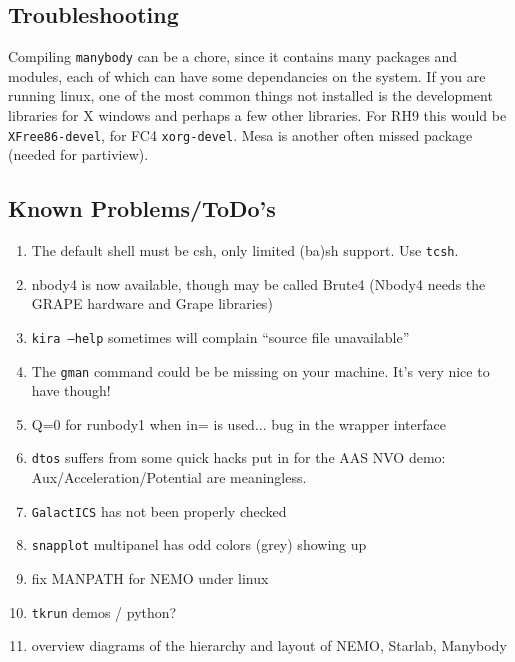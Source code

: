 \begin{itemize}
\begin{itemize}
\chapter                {Troubleshooting}

Compiling {\tt manybody} can be a chore, since it contains many packages
and modules, each of which can have some dependancies on the system.
If you are running linux, one of the most common things not installed
is the development libraries for X windows and perhaps a few other libraries.
For RH9 this would be {\tt  XFree86-devel}, for FC4 {\tt xorg-devel}.
Mesa is another often missed package (needed for partiview).

\section{Known Problems/ToDo's}
\begin{enumerate}

\item
The default shell must be csh, only limited (ba)sh support. Use {\tt tcsh}.

\item
nbody4 is now available, though may be called Brute4 (Nbody4 needs the
GRAPE hardware and Grape libraries)

\item
{\tt kira --help} sometimes will complain ``source file unavailable''

\item
The {\tt gman} command could be be missing on your machine. 
It's very nice to have though!

\item
Q=0 for runbody1 when in= is used...   bug in the wrapper interface

\item
{\tt dtos} suffers from some quick hacks put in for the AAS NVO demo:
Aux/Acceleration/Potential are meaningless.

\item
{\tt GalactICS} has not been properly checked 

\item
{\tt snapplot} multipanel has odd colors (grey) showing up

\item
fix MANPATH for NEMO under linux

\item
{\tt tkrun} demos / python?

\item
overview diagrams of the hierarchy and layout of NEMO, Starlab, Manybody


\end{enumerate}
\end{itemize}
\end{itemize}
